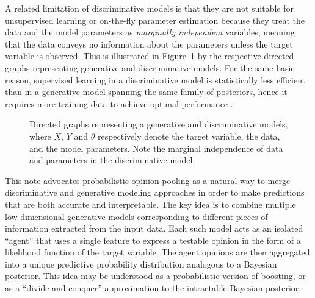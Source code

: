 \documentclass[english]{scrartcl}
\begin{document}
A related limitation of discriminative models is that they are not suitable for unsupervised learning or on-the-fly parameter estimation because they treat the data and the model parameters as {\em marginally independent} variables, meaning that the data conveys no information about the parameters unless the target variable is observed. This is illustrated in Figure~\ref{fig:graph_comparison} by the respective directed graphs representing generative and discriminative models. For the same basic reason, supervised learning in a discriminative model is statistically less efficient than in a generative model spanning the same family of posteriors, hence it requires more training data to achieve optimal performance \cite{Ng-01}. 


\begin{figure}[!ht]
\begin{center}
\hspace*{.2\textwidth}
\caption{Directed graphs representing a generative and discriminative models, where $X$, $Y$ and $\theta$ respectively denote the target variable, the data, and the model parameters. Note the marginal independence of data and parameters in the discriminative model.}
\label{fig:graph_comparison}
\end{center}
\end{figure}

This note advocates probabilistic opinion pooling \cite{Genest-86} as a natural way to merge discriminative and generative modeling approaches in order to make predictions that are both accurate and interpretable. The key idea is to combine multiple low-dimensional generative models corresponding to different pieces of information extracted from the input data. Each such model acts as an isolated ``agent'' that uses a single feature to express a testable opinion in the form of a likelihood function of the target variable. The agent opinions are then aggregated into a unique predictive probability distribution analogous to a Bayesian posterior. This idea may be understood as a probabilistic version of boosting, or as a ``divide and conquer'' approximation to the intractable Bayesian posterior. 
\end{document}
